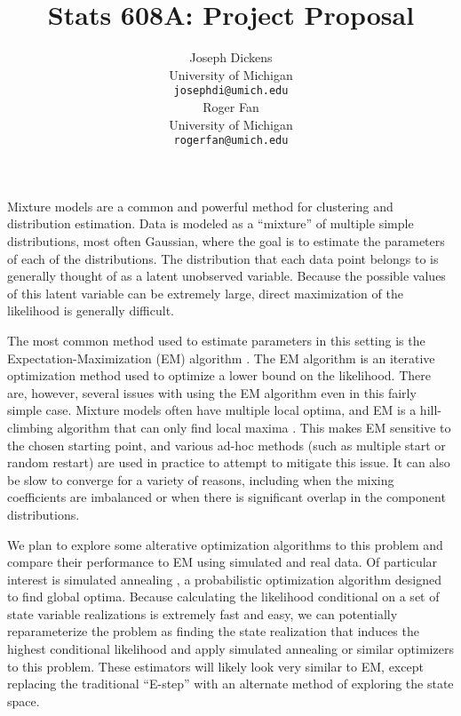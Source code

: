 \documentclass{article}
\theoremstyle{definition}
\begin{document}
\title{Stats 608A: Project Proposal}
\author{
  Joseph Dickens \\
  University of Michigan \\
  \texttt{josephdi@umich.edu} \\
\And
  Roger Fan \\
  University of Michigan\\
  \texttt{rogerfan@umich.edu} \\
}

\maketitle


Mixture models are a common and powerful method for clustering and distribution estimation. Data is modeled as a ``mixture'' of multiple simple distributions, most often Gaussian, where the goal is to estimate the parameters of each of the distributions. The distribution that each data point belongs to is generally thought of as a latent unobserved variable. Because the possible values of this latent variable can be extremely large, direct maximization of the likelihood is generally difficult.

The most common method used to estimate parameters in this setting is the Expectation-Maximization (EM) algorithm \cite{dempsterlairdrubin77}. The EM algorithm is an iterative optimization method used to optimize a lower bound on the likelihood. There are, however, several issues with using the EM algorithm even in this fairly simple case. Mixture models often have multiple local optima, and EM is a hill-climbing algorithm that can only find local maxima \cite{wu83}. This makes EM sensitive to the chosen starting point, and various ad-hoc methods (such as multiple start or random restart) are used in practice to attempt to mitigate this issue. It can also be slow to converge for a variety of reasons, including when the mixing coefficients are imbalanced or when there is significant overlap in the component distributions.

We plan to explore some alterative optimization algorithms to this problem and compare their performance to EM using simulated and real data. Of particular interest is simulated annealing \cite{kirkpatrickgelattvecchi83}, a probabilistic optimization algorithm designed to find global optima. Because calculating the likelihood conditional on a set of state variable realizations is extremely fast and easy, we can potentially reparameterize the problem as finding the state realization that induces the highest conditional likelihood and apply simulated annealing or similar optimizers to this problem. These estimators will likely look very similar to EM, except replacing the traditional ``E-step'' with an alternate method of exploring the state space.
\end{document}
